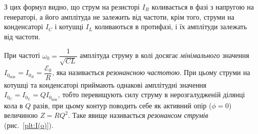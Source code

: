\documentclass[]{LabWork}
\begin{document}
З цих формул видно, що струм на резисторі $I_R$ коливається в фазі з напругою на генераторі, а його амплітуда не залежить від частоти, крім того, струми на конденсаторі $I_C$ і котушці $I_L$ коливаються в протифазі, і їх амплітуди залежать від частоти.

При частоті $\omega_0 = \dfrac{1}{\sqrt{CL}}$ амплітуда струму в колі досягає \emph{мінімального} значення $I_{0_{\min}} = I_{0_R}  = \dfrac{\mathcal{E}_0}{R}$, яка називається \emph{резонансною частотою}. При цьому струми на котушці та конденсаторі приймають однакові амплітудні значення $I_{0_C} = I_{0_L} = Q I_{0_{\min}}$, тобто перевищують силу струму в нерозгалудженій ділянці кола в $Q$ разів, при цьому контур поводить себе як активний опір ($\phi = 0$) величиною $Z = RQ^2$. Таке явище називається \emph{резонансом струмів} (рис.~\ref{plt:I(o)}).
\end{document}
